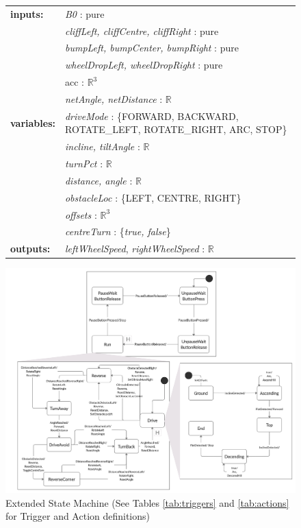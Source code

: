 \begin{figure}[p]
    \centering
    \begin{tabular}{ll}
      \textbf{inputs:}   & \textit{B0} : pure\\
                         & \textit{cliffLeft, cliffCentre, cliffRight} : pure \\
                         & \textit{bumpLeft, bumpCenter, bumpRight} : pure \\
                         & \textit{wheelDropLeft, wheelDropRight} : pure\\
                         & acc : $\mathbb{R}^3$\\
                         & \textit{netAngle, netDistance} : $\mathbb{R}$\\
      \textbf{variables:}& \textit{driveMode} : \{FORWARD, BACKWARD, ROTATE\_LEFT, ROTATE\_RIGHT, ARC, STOP\}\\
                         & \textit{incline, tiltAngle} : $\mathbb{R}$\\
                         & \textit{turnPct} : $\mathbb{R}$\\
                         & \textit{distance, angle} : $\mathbb{R}$\\
                         & \textit{obstacleLoc} : \{LEFT, CENTRE, RIGHT\}\\
                         & \textit{offsets} : $\mathbb{R}^3$\\
                         & \textit{centreTurn} : \{\textit{true, false}\}\\
     \textbf{outputs:}   & \textit{leftWheelSpeed}, \textit{rightWheelSpeed} :  $\mathbb{R}$\\
    \end{tabular}
    \includegraphics[width=\textwidth]{Images/Finite_State_Machine_v2.png}
    \caption{Extended State Machine (See Tables \ref{tab:triggers} and \ref{tab:actions} for Trigger and Action definitions)}
    \label{fig:FSM}
\end{figure}

